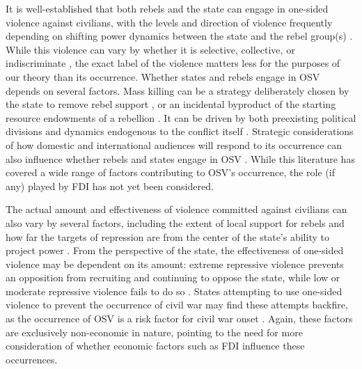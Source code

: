 \documentclass[11pt, titlepage]{article} %
\begin{document}
It is well-established that both rebels and the state can engage in one-sided violence against civilians, with the levels and direction of violence frequently depending on shifting power dynamics between the state and the rebel group(s) \parencite{kalyvas2006logic,kalyvas2007free,wood2012armed}. While this violence can vary by whether it is selective, collective, or indiscriminate \parencite{kalyvas2007free,schubiger2023one}, the exact label of the violence matters less for the purposes of our theory than its occurrence. Whether states and rebels engage in OSV depends on several factors. Mass killing can be a strategy deliberately chosen by the state to remove rebel support \parencite{valentino2004draining, downes2007draining}, or an incidental byproduct of the starting resource endowments of a rebellion \parencite{Weinstein07}. It can be driven by both preexisting political divisions and dynamics endogenous to the conflict itself \parencite{ balcells2010rivalry}. Strategic considerations of how domestic and international audiences will respond to its occurrence can also influence whether rebels and states engage in OSV \parencite{stanton2016violence}. While this literature has covered a wide range of factors contributing to OSV's occurrence, the role (if any) played by FDI has not yet been considered.

The actual amount and effectiveness of violence committed against civilians can also vary by several factors, including the extent of local support for rebels \parencite{toft2015islamists, zhukov2017external} and how far the targets of repression are from the center of the state’s ability to project power \parencite{cunningham2009takes}. From the perspective of the state, the effectiveness of one-sided violence may be dependent on its amount: extreme repressive violence prevents an opposition from recruiting and continuing to oppose the state, while low or moderate repressive violence fails to do so \parencite{zhukov2023repression}. States attempting to use one-sided violence to prevent the occurrence of civil war may find these attempts backfire, as the occurrence of OSV is a risk factor for civil war onset \parencite{ young2013repression, cederman2020civilian}. Again, these factors are exclusively non-economic in nature, pointing to the need for more consideration of whether economic factors such as FDI influence these occurrences.
\end{document}
